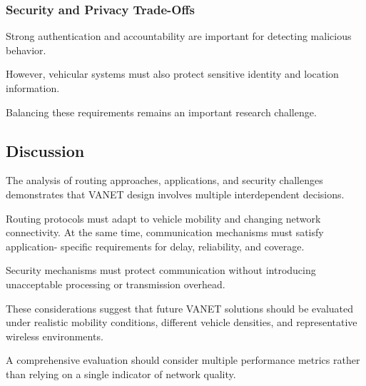 \subsubsection{Security and Privacy Trade-Offs}

Strong authentication
and accountability
are important for
detecting malicious
behavior.

However, vehicular
systems must also
protect sensitive
identity and
location information.

Balancing these
requirements remains
an important
research challenge.

\subsection{Discussion}
\label{sec:3F}

The analysis of
routing approaches,
applications, and
security challenges
demonstrates that
VANET design
involves multiple
interdependent
decisions.

Routing protocols
must adapt to
vehicle mobility
and changing
network connectivity.
At the same time,
communication
mechanisms must
satisfy application-
specific requirements
for delay,
reliability,
and coverage.

Security mechanisms
must protect
communication
without introducing
unacceptable
processing or
transmission overhead.

These considerations
suggest that
future VANET
solutions should
be evaluated
under realistic
mobility conditions,
different vehicle
densities, and
representative
wireless environments.

A comprehensive
evaluation should
consider multiple
performance metrics
rather than relying
on a single
indicator of
network quality.
